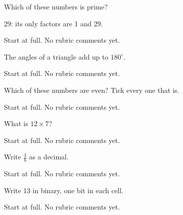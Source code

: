 \documentclass{course}
\begin{document}
\MakeCoverPage
\begin{questions}

\question[2] Which of these numbers is prime?
\par\smallskip\noindent
{}\choice[{21}]\hspace{1.5em}
\choice[{27}]\hspace{1.5em}
\correctchoice[{29}]\hspace{1.5em}
\choice[{33}]
\par
\begin{solution}
29: its only factors are 1 and 29.
\end{solution}
\begin{marking}{Start at full.}
No rubric comments yet.
\end{marking}

\question[1] The angles of a triangle add up to $180^\circ$.
\begin{marking}{Start at full.}
No rubric comments yet.
\end{marking}

\question[2] Which of these numbers are even? Tick every one that is.
\par\smallskip\noindent
{}\correctcheckbox[{14}]\hspace{1.5em}
\checkbox[{25}]\hspace{1.5em}
\correctcheckbox[{36}]\hspace{1.5em}
\checkbox[{49}]
\par
\begin{marking}{Start at full.}
No rubric comments yet.
\end{marking}

\question[2] What is $12 \times 7$? 
\begin{marking}{Start at full.}
No rubric comments yet.
\end{marking}

\question[2] Write $\frac{3}{8}$ as a decimal. 
\begin{marking}{Start at full.}
No rubric comments yet.
\end{marking}

\question[2] Write 13 in binary, one bit in each cell. 
\begin{marking}{Start at full.}
No rubric comments yet.
\end{marking}


\end{questions}
\end{document}
